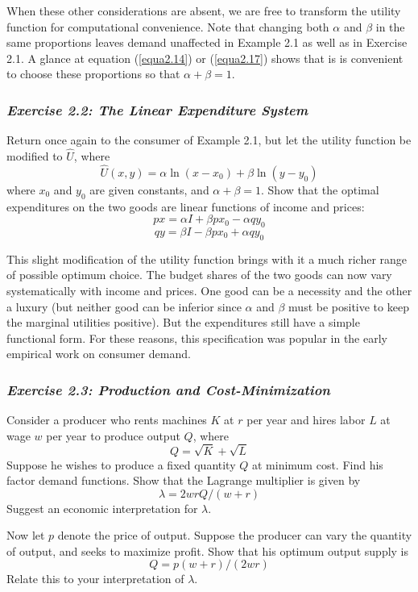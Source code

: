 When these other considerations are absent, we are free to transform the utility function for computational convenience. Note that changing both $\alpha$ and $\beta$ in the same proportions leaves demand unaffected in Example 2.1 as well as in Exercise 2.1. A glance at equation (\ref{equa2.14}) or (\ref{equa2.17}) shows that is is convenient to choose these proportions so that $\alpha + \beta =1$.

\subsubsection*{\textit{Exercise 2.2: The Linear Expenditure System}}

Return once again to the consumer of Example 2.1, but let the utility function be modified to $\hat{U}$, where
\begin{equation*}
\hat{U}(x,y) = \alpha \ln(x-x_0) + \beta \ln(y-y_0)
\end{equation*}
where $x_0$ and $y_0$ are given constants, and $\alpha + \beta=1$. Show that the optimal expenditures on the two goods are linear functions of income and prices:
\begin{equation*}
px = \alpha I + \beta p x_0 - \alpha q y_0
\end{equation*}
\begin{equation*}
qy = \beta I - \beta p x_0 + \alpha q y_0
\end{equation*}

This slight modification of the utility function brings with it a much richer range of possible optimum choice. The budget shares of the two goods can now vary systematically with income and prices. One good can be a necessity and the other a luxury (but neither good can be inferior since $\alpha$ and $\beta$ must be positive to keep the marginal utilities positive). But the expenditures still have a simple functional form. For these reasons, this specification was popular in the early empirical work on consumer demand. 

\subsubsection*{\textit{Exercise 2.3: Production and Cost-Minimization}}

Consider a producer who rents machines $K$ at $r$ per year and hires labor $L$ at wage $w$ per year to produce output $Q$, where
\begin{equation*}
Q = \sqrt{K} + \sqrt{L}
\end{equation*}
Suppose he wishes to produce a fixed quantity $Q$ at minimum cost. Find his factor demand functions. Show that the Lagrange multiplier is given by 
\begin{equation*}
\lambda = 2 w r Q/(w+r)
\end{equation*}
Suggest an economic interpretation for $\lambda$.

Now let $p$ denote the price of output. Suppose the producer can vary the quantity of output, and seeks to maximize profit. Show that his optimum output supply is 
\begin{equation*}
Q = p(w+r)/(2wr)
\end{equation*}
Relate this to your interpretation of $\lambda$.















